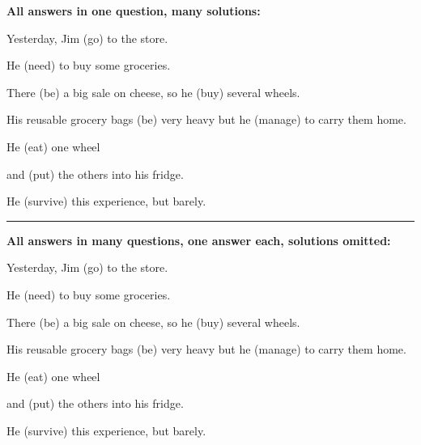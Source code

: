 \documentclass{ximera}
\begin{document}
\begin{question}
\begin{solution}

\textbf{All answers in one question, many solutions:}

Yesterday, Jim  (go) to the store.\end{solution}\begin{solution} He  (need) to buy some groceries.\end{solution}\begin{solution} There  (be) a big sale on cheese, so he  (buy) several wheels.\end{solution}\begin{solution} His reusable grocery bags  (be) very heavy but he  (manage) to carry them home.\end{solution}\begin{solution} He  (eat) one wheel\end{solution}\begin{solution} and  (put) the others into his fridge.\end{solution}\begin{solution} He  (survive) this experience, but barely.

\end{solution}
\end{question}

\rule{1cm}{1pt}

\begin{question}

\textbf{All answers in many questions, one answer each, solutions omitted:}

Yesterday, Jim  (go) to the store.\end{question}\begin{question} He  (need) to buy some groceries.\end{question}\begin{question} There  (be) a big sale on cheese, so he  (buy) several wheels.\end{question}\begin{question} His reusable grocery bags  (be) very heavy but he  (manage) to carry them home.\end{question}\begin{question} He  (eat) one wheel\end{question}\begin{question} and  (put) the others into his fridge.\end{question} \begin{question} He  (survive) this experience, but barely.

\end{question}
\end{document}
